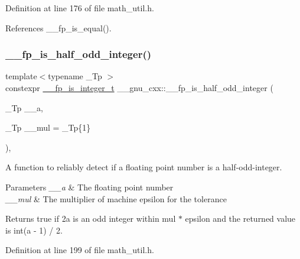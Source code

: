 Definition at line 176 of file math\+\_\+util.\+h.



References \+\_\+\+\_\+fp\+\_\+is\+\_\+equal().

\mbox{\label{namespace____gnu__cxx_a6d99c5dcab15b6837c2a60f2b367ed2c}} 
\subsubsection{\texorpdfstring{\+\_\+\+\_\+fp\+\_\+is\+\_\+half\+\_\+odd\+\_\+integer()}{\_\_fp\_is\_half\_odd\_integer()}}
{\footnotesize\ttfamily template$<$typename \+\_\+\+Tp $>$ \\
constexpr \hyperlink{struct____gnu__cxx_1_1____fp__is__integer__t}{\+\_\+\+\_\+fp\+\_\+is\+\_\+integer\+\_\+t} \+\_\+\+\_\+gnu\+\_\+cxx\+::\+\_\+\+\_\+fp\+\_\+is\+\_\+half\+\_\+odd\+\_\+integer (\begin{DoxyParamCaption}\item[{\+\_\+\+Tp}]{\+\_\+\+\_\+a,  }\item[{\+\_\+\+Tp}]{\+\_\+\+\_\+mul = {\ttfamily \+\_\+Tp\{1\}} }\end{DoxyParamCaption})\hspace{0.3cm}{\ttfamily [inline]}, {\ttfamily [noexcept]}}

A function to reliably detect if a floating point number is a half-\/odd-\/integer.


\begin{DoxyParams}{Parameters}
{\em \+\_\+\+\_\+a} & The floating point number \\
\hline
{\em \+\_\+\+\_\+mul} & The multiplier of machine epsilon for the tolerance \\
\hline
\end{DoxyParams}
\begin{DoxyReturn}{Returns}
{\ttfamily true} if 2a is an odd integer within mul $\ast$ epsilon and the returned value is int(a -\/ 1) / 2. 
\end{DoxyReturn}


Definition at line 199 of file math\+\_\+util.\+h.




